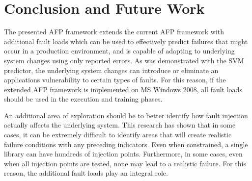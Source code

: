 \section{Conclusion and Future Work} \label{chapter5}
The presented \ac{AFP} framework extends the current \ac{AFP} framework with
additional fault loads which can be used to effectively predict failures that
might occur in a production environment, and is capable of adapting to
underlying system changes using only reported errors.  As was demonstrated with
the \ac{SVM} predictor, the underlying system changes can introduce or
eliminate an applications vulnerability to certain types of faults.  For this
reason, if the extended \ac{AFP} framework is implemented on \ac{MS} Windows
2008, all fault loads should be used in the execution and training phases.

An additional area of exploration should be to better identify how fault
injection actually affects the underlying system.  This research has shown that
in some cases, it can be extremely difficult to identify areas that will create
realistic failure conditions with any preceding indicators.  Even when
constrained, a single library can have hundreds of injection points.
Furthermore, in some cases, even when all injection points are tested, none may
lead to a realistic failure.  For this reason, the additional fault loads play
an integral role.
